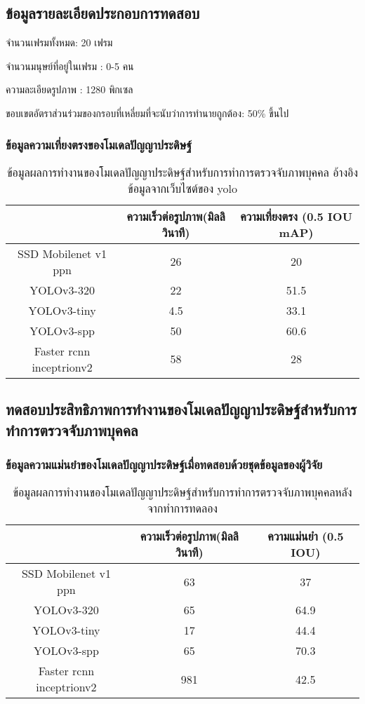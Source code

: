 
\subsection{ข้อมูลรายละเอียดประกอบการทดสอบ}
จำนวนเฟรมทั้งหมด: 20 เฟรม

จำนวนมนุษย์ที่อยู่ในเฟรม : 0-5 คน

ความละเอียดรูปภาพ : 1280   พิกเซล

ขอบเขตอัตราส่วนร่วมของกรอบที่เหลี่ยมที่จะนับว่าการทำนายถูกต้อง: 50\% ขึ้นไป

\subsubsection*{ข้อมูลความเที่ยงตรงของโมเดลปัญญาประดิษฐ์}
\begin{table}[!ht]
    \centering
	\begin{tabular}{|c|c|c|}
			\hline
			{}&{ความเร็วต่อรูปภาพ(มิลลิวินาที)}&{ความเที่ยงตรง (0.5 IOU mAP)}			\\
			\hline
			SSD Mobilenet v1 ppn	 		& 26				& 20														\\
			YOLOv3-320				& 22				& 51.5				\\	
			YOLOv3-tiny				& 4.5				& 33.1				\\
			YOLOv3-spp				& 50				& 60.6				\\	
			Faster rcnn inceptrionv2		& 58				& 28		\\
		\hline
	\end{tabular}
	\caption{ข้อมูลผลการทำงานของโมเดลปัญญาประดิษฐ์สำหรับการทำการตรวจจับภาพบุคคล อ้างอิงข้อมูลจากเว็บไซต์ของ yolo}
    	\label{tab:origina_detectEx}
\end{table}


\subsection{ทดสอบประสิทธิภาพการทำงานของโมเดลปัญญาประดิษฐ์สำหรับการทำการตรวจจับภาพบุคคล}
\subsubsection*{ข้อมูลความแม่นยำของโมเดลปัญญาประดิษฐ์เมื่อทดสอบด้วยชุดข้อมูลของผู้วิจัย}
\begin{table}[!ht]
	\centering
	\begin{tabular}{|c|c|c|}
			\hline 
			{}&{ความเร็วต่อรูปภาพ(มิลลิวินาที)}&{ความแม่นยำ (0.5 IOU)}			\\
			\hline
			SSD Mobilenet v1 ppn	 					& 63 			& 37			\\
			YOLOv3-320							& 65			& 64.9		\\
			YOLOv3-tiny							& 17			& 44.4			\\
			YOLOv3-spp							& 65			& 70.3			\\	
			Faster rcnn inceptrionv2					& 981		& 42.5		\\
		\hline
	\end{tabular}
	\caption{ข้อมูลผลการทำงานของโมเดลปัญญาประดิษฐ์สำหรับการทำการตรวจจับภาพบุคคลหลังจากทำการทดลอง}
    	\label{tab:origina_detectEx}
\end{table}
